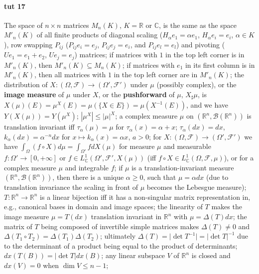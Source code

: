 \documentclass[a4paper]{article}
\newcommand{\Fcal}{\mathcal{F}}
\newcommand{\Bcal}{\mathcal{B}}
\newcommand{\real}{\mathbb{R}}
\newcommand{\cplx}{\mathbb{C}}
\begin{document}


\paragraph{tut 17} %
\label{par:tut_17}

The space of $n\times n$ matrices $M_n(K)$, $K = \real$ or $\cplx$, is the same as the space $M'_n(K)$ of all finite products of diagonal scaling ($H_\alpha e_1 = \alpha e_1$, $H_\alpha e_i = e_i$, $\alpha \in K$), row swapping $P_{ij}$ ($P_{ij} e_i = e_j$, $P_{ij} e_j = e_i$, and $P_{ij} e_l = e_l$) and pivoting ($U e_1 = e_1 + e_2$, $U e_j = e_j$) matrices;
if matrices with $1$ in the top left corner is in $M'_n(K)$, then $M'_n(K) \subseteq M_n(K)$;
if matrices with $e_1$ in its first column is in $M'_n(K)$, then all matrices with $1$ in the top left corner are in $M'_n(K)$;
the distribution of $X\colon (\Omega, \Fcal) \to (\Omega', \Fcal')$ under $\mu$ (possibly complex), or the {\bf image measure} of $\mu$ under $X$, or the {\bf pushforward} of $\mu$, $X_\sharp\mu$, is $X(\mu)(E) = \mu^X(E) = \mu(\{X \in E\}) = \mu(X^{-1}(E))$, and we have $Y(X(\mu)) = Y(\mu^X)$;
$|\mu^X| \leq |\mu|^X$;
a complex measure $\mu$ on $(\real^n, \Bcal(\real^n))$ is translation invariant iff $\tau_\alpha(\mu) = \mu$ for $\tau_\alpha(x) = \alpha + x$;
$\tau_\alpha(dx) = dx$, $k_\alpha(dx) = \alpha^{-n} dx$ for $x\mapsto k_\alpha(x) = \alpha x$, $a > 0$;
for $X\colon (\Omega, \Fcal) \to (\Omega', \Fcal')$ we have $\int_{\Omega} (f \circ X) d\mu = \int_{\Omega'} f dX(\mu)$ for measure $\mu$ and measurable $f\colon \Omega' \to [0, +\infty]$ or $f\in L^1_\cplx(\Omega', \Fcal', X(\mu))$ (iff $f\circ X \in L^1_\cplx(\Omega, \Fcal, \mu)$), or for a complex measure $\mu$ and integrable $f$;
if $\mu$ is a translation-invariant measure $(\real^n, \Bcal(\real^n))$, then there is a unique $\alpha \geq 0$, such that $\mu = \alpha dx$ (due to translation invariance the scaling in front of $\mu$ becomes the Lebesgue measure);
$T\colon \real^n \to \real^n$ is a linear bijection iff it has a non-singular matrix representation in, e.g., canonical bases in domain and image spaces;
the linearity of $T$ makes the image measure $\mu = T(dx)$ translation invariant in $\real^n$ with $\mu = \Delta(T) dx$;
the matrix of $T$ being composed of invertible simple matrices makes $\Delta(T) \neq 0$ and $\Delta(T_1 \circ T_2) = \Delta(T_1) \Delta(T_2)$;
ultimately $\Delta(T) = \lvert \det T^{-1} \rvert = \lvert \det T \rvert^{-1}$ due to the determinant of a product being equal to the product of determinants;
$dx(T(B)) = \lvert \det T\rvert dx(B)$;
any linear subspace $V$ of $\real^n$ is closed and $dx(V) = 0$ when $\dim V \leq n-1$;
\end{document}
